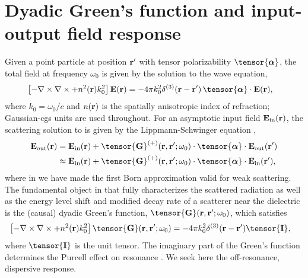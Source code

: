 \documentclass[preprint,aps,pra,onecolumn]{revtex4-1} %
\newcommand{\inp}{{\rm in}}
\newcommand{\out}{{\rm out}}
\newcommand{\unittens}{\tensor{\mathbf{I}}}
\begin{document}
\section{Dyadic Green's function and input-output field response}

Given a point particle at position $\mathbf{r}'$ with tensor polarizability $\tensor{\boldsymbol{\alpha}}$, the total field  at frequency $\omega_0$ is given by the solution to the wave equation, 
	\begin{align}\label{Eq::WaveEquationSource}
		\left[ - \nabla \times\nabla \times + n^2(\br)k_0^2 \right] \mathbf{E}(\br) &= -4\pi  k_0^2 \delta^{(3)}(\br-\br')\,  \tensor{\boldsymbol{\alpha}}\cdot \mathbf{E}(\br),
	\end{align}
where $k_0=\omega_0/c$ and $n(\mathbf{r})$ is the spatially anisotropic index of refraction; Gaussian-cgs units are used throughout.  For an asymptotic input field $\mathbf{E}_{\inp}(\br)$, the scattering solution to  is given by the Lippmann-Schwinger equation \cite{wubs_multiple-scattering_2004},
	\begin{align}
		\mathbf{E}_{\out}(\br) &=\mathbf{E}_{\inp}(\br)+\tensor{\mathbf{G}}^{(+)}(\br , \br'; \omega_0)\cdot 
\tensor{\boldsymbol{\alpha}}\cdot \mathbf{E}_{\out}(\br')\\
		&\approx \mathbf{E}_{\inp}(\br)+ \tensor{\mathbf{G}}^{(+)}(\br , \br'; \omega_0) \cdot 
\tensor{\boldsymbol{\alpha}}\cdot \mathbf{E}_{\inp}(\br'), \label{Eq::ScatteredField}
	\end{align}
where in  we have made the first Born approximation valid for weak scattering. The fundamental object in that fully characterizes the scattered radiation as well as the energy level shift and modified decay rate of a scatterer near the dielectric is the (causal) dyadic Green's function, $\tensor{\mathbf{G}}(\br, \br';\omega_0)$, which satisfies
	\begin{align} \label{Eq::GreensDiffEq}
		\left[ -\nabla\times\nabla\times + n^2(\mbf{r}) k_0^2 \right] \tensor{\mathbf{G}}(\br, \br';\omega_0) &= -4\pi 
k_0^2 \delta^{(3)}(\mathbf{r}-\mathbf{r}') \unittens,
	\end{align}
where $\unittens$ is the unit tensor.  The imaginary part of the Green's function determines the Purcell effect on resonance \cite{}.  We seek here the off-resonance, dispersive response.  
\end{document}
